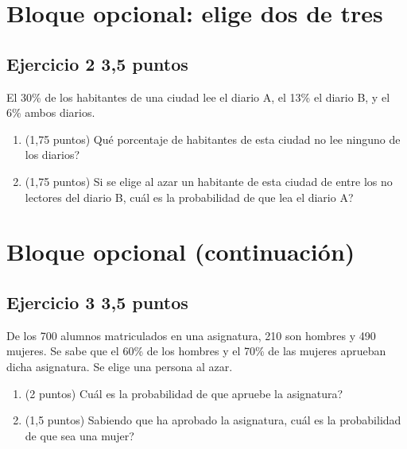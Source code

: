 \documentclass[11pt]{article}
\begin{document}
\section*{Bloque opcional: elige dos de tres}
\subsection*{Ejercicio 2 \hfill 3,5 puntos} El 30\% de los habitantes de una ciudad lee el diario A, el 13\% el diario B, y el 6\% ambos diarios.

\begin{enumerate}[label=(\alph*)]

\item (1,75 puntos)  \textquestiondown{}Qué porcentaje de habitantes de esta ciudad no lee ninguno de los diarios?



\item (1,75 puntos)  Si se elige al azar un habitante de esta ciudad de entre los no lectores del diario B, \textquestiondown{}cuál es la probabilidad de que lea el diario A?



\end{enumerate}

\clearpage
\section*{Bloque opcional (continuación)}
\subsection*{Ejercicio 3 \hfill 3,5 puntos} De los 700 alumnos matriculados en una asignatura, 210 son hombres y 490 mujeres. Se sabe que el 60\% de los hombres y el 70\% de las mujeres aprueban dicha asignatura. Se elige una persona al azar.

\begin{enumerate}[label=(\alph*)]

\item (2 puntos)  \textquestiondown{}Cuál es la probabilidad de que apruebe la asignatura?



\item (1,5 puntos)  Sabiendo que ha aprobado la asignatura, \textquestiondown{}cuál es la probabilidad de que sea una mujer?



\end{enumerate}
\end{document}
